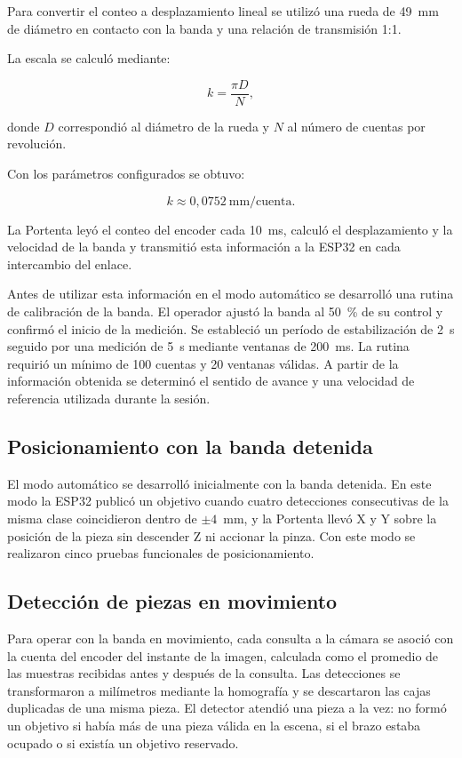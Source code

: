 Para convertir el conteo a desplazamiento lineal se utilizó una rueda de 49~mm de diámetro en contacto con la banda y una relación de transmisión 1:1.

La escala se calculó mediante:

\[
k=\frac{\pi D}{N},
\]

donde $D$ correspondió al diámetro de la rueda y $N$ al número de cuentas por revolución.

Con los parámetros configurados se obtuvo:

\[
k \approx 0{,}0752\ \text{mm/cuenta}.
\]

La Portenta leyó el conteo del encoder cada 10~ms, calculó el desplazamiento y la velocidad de la banda y transmitió esta información a la ESP32 en cada intercambio del enlace.

Antes de utilizar esta información en el modo automático se desarrolló una rutina de calibración de la banda. El operador ajustó la banda al 50~\% de su control y confirmó el inicio de la medición. Se estableció un período de estabilización de 2~s seguido por una medición de 5~s mediante ventanas de 200~ms. La rutina requirió un mínimo de 100 cuentas y 20 ventanas válidas. A partir de la información obtenida se determinó el sentido de avance y una velocidad de referencia utilizada durante la sesión.



\subsection{Posicionamiento con la banda detenida}

El modo automático se desarrolló inicialmente con la banda detenida. En este modo la ESP32 publicó un objetivo cuando cuatro detecciones consecutivas de la misma clase coincidieron dentro de $\pm4$~mm, y la Portenta llevó X y Y sobre la posición de la pieza sin descender Z ni accionar la pinza. Con este modo se realizaron cinco pruebas funcionales de posicionamiento.


\subsection{Detección de piezas en movimiento}

Para operar con la banda en movimiento, cada consulta a la cámara se asoció con la cuenta del encoder del instante de la imagen, calculada como el promedio de las muestras recibidas antes y después de la consulta. Las detecciones se transformaron a milímetros mediante la homografía y se descartaron las cajas duplicadas de una misma pieza. El detector atendió una pieza a la vez: no formó un objetivo si había más de una pieza válida en la escena, si el brazo estaba ocupado o si existía un objetivo reservado.

